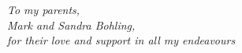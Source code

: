 \chapter*{}
\begin{center}
{\centering \it To my parents, \\
Mark and Sandra Bohling, \\
for their love and support in all my endeavours}
\end{center} 